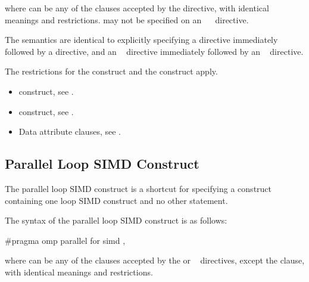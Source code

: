 {{{{where  can be any of the clauses accepted by the  directive, with 
identical meanings and restrictions.  may not be specified on an 
~~ directive.

\descr
The semantics are identical to explicitly specifying a  directive immediately 
followed by a  directive, and an ~ directive immediately 
followed by an ~ directive. 

\restrictions
The restrictions for the  construct and the  construct apply.

\crossreferences
\begin{itemize}
\item {} construct, see 
. 

\item {} construct, see 
.

\item Data attribute clauses, see 
.
\end{itemize}
\fortranspecificend










\subsection{Parallel Loop SIMD Construct}
\label{subsec:Parallel Loop SIMD Construct}
\summary
The parallel loop SIMD construct is a shortcut for specifying a  construct 
containing one loop SIMD construct and no other statement.

\begin{samepage}
\syntax
\ccppspecificstart
The syntax of the parallel loop SIMD construct is as follows:

\begin{boxedcode}
\#pragma omp parallel for simd \plc{[clause[ [},\plc{] clause] ... ] new-line}
\end{boxedcode}

where  can be any of the clauses accepted by the 
or ~ directives, except the  clause, with 
identical meanings and restrictions.
\ccppspecificend
\end{samepage}

}}}}
